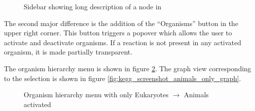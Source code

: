 \begin{figure}[hbt]
    \caption{\label{fig:kegg_screenshot_selection_no_info} Sidebar showing
    long description of a node in \keggapp}
\end{figure}

The second major difference is the addition of the ``Organisms'' button in the
upper right corner. This button triggers a popover which allows the user to
activate and deactivate organisms. If a reaction is not present in any activated
organism, it is made partially transparent.

The organism hierarchy menu is shown in figure
\ref{fig:kegg_screenshot_animals_only_list}. The graph view corresponding to the
selection is shown in figure \ref{fig:kegg_screenshot_animals_only_graph}.

\begin{figure}[hbt]
    \caption{\label{fig:kegg_screenshot_animals_only_list} Organism hierarchy
    menu with only Eukaryotes $\rightarrow$ Animals activated}
\end{figure}

